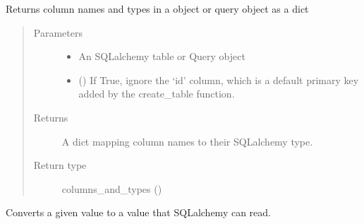 \documentclass[letterpaper,10pt,english]{sphinxmanual}
\begin{document}

\begin{fulllineitems}
\label{\detokenize{Fireworks:Fireworks.extensions.database.parse_columns_and_types}}
Returns column names and types in a object or query object as a dict
\begin{quote}\begin{description}
\item[{Parameters}] \leavevmode\begin{itemize}
\item {} 
 \textendash{} An SQLalchemy table or Query object

\item {} 
 () \textendash{} If True, ignore the ‘id’ column, which is a default primary key
added by the create\_table function.

\end{itemize}

\item[{Returns}] \leavevmode
A dict mapping column names to their SQLalchemy type.

\item[{Return type}] \leavevmode
columns\_and\_types ()

\end{description}\end{quote}

\end{fulllineitems}


\begin{fulllineitems}
\label{\detokenize{Fireworks:Fireworks.extensions.database.convert}}
Converts a given value to a value that SQLalchemy can read.

\end{fulllineitems}
\end{document}
